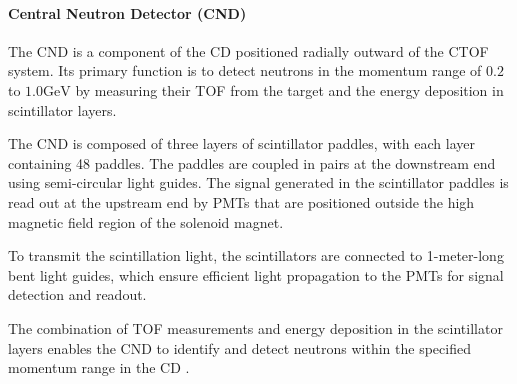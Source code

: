 \paragraph{Central Neutron Detector (CND)}
    The CND is a component of the CD positioned radially outward of the CTOF system.
    Its primary function is to detect neutrons in the momentum range of $0.2$ to $1.0 \text{GeV}$ by measuring their TOF from the target and the energy deposition in scintillator layers.

    The CND is composed of three layers of scintillator paddles, with each layer containing 48 paddles.
    The paddles are coupled in pairs at the downstream end using semi-circular light guides.
    The signal generated in the scintillator paddles is read out at the upstream end by PMTs that are positioned outside the high magnetic field region of the solenoid magnet.

    To transmit the scintillation light, the scintillators are connected to 1-meter-long bent light guides, which ensure efficient light propagation to the PMTs for signal detection and readout.

    The combination of TOF measurements and energy deposition in the scintillator layers enables the CND to identify and detect neutrons within the specified momentum range in the CD \cite{chatagnon2020}.
